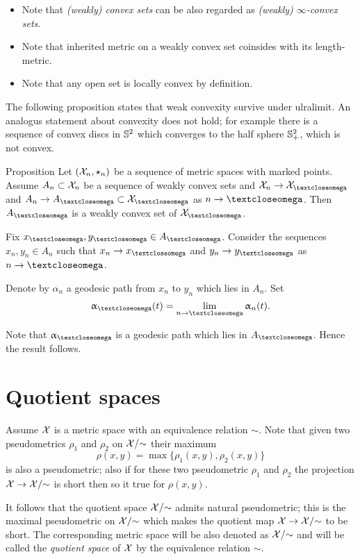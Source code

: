 \begin{itemize}
\item Note that \emph{(weakly) convex sets} can be also regarded as \emph{(weakly) $\infty$-convex sets}.
\item Note that inherited metric on a weakly convex set coinsides with its length-metric.
\item Note that any open set is locally convex by definition.
\end{itemize}

The following proposition states that weak convexity survive under ulralimit.
An analogus statement about convexity does not hold;
for example there is a sequence of convex discs in $\mathbb{S}^2$ which converges to the half sphere $\mathbb{S}^2_+$, which is not convex.

\begin{thm}{Proposition}\label{prop:weak-convex-stable}
Let $(\mathcal{X}_n,\star_n)$ be a sequence of metric spaces with marked points.
Assume $A_n\subset \spc{X}_n$ be a sequence of weakly convex sets and 
$\spc{X}_n\to \spc{X}_\o$ and $A_n\to A_\o\subset \spc{X}_\o$ as $n\to\o$.
Then $A_\o$ is a weakly convex set of $\spc{X}_\o$.
\end{thm}

Fix $x_\o,y_\o\in A_\o$.
Consider the sequences $x_n,y_n\in A_n$ such that $x_n\to x_\o$ and $y_n\to y_\o$ as $n\to\o$.

Denote by $\alpha_n$ a geodesic path from $x_n$ to $y_n$ which lies in $A_n$.
Set
\[\alpha_\o(t)=\lim_{n\to \o}\alpha_n(t).\]

Note that $\alpha_\o$ is a geodesic path which lies in $A_\o$.
Hence the result follows.
\qeds






\section{Quotient spaces}\label{sec:quotient}

 Assume $\mathcal{X}$ is a metric space
with an equivalence relation $\sim$.
Note that given two pseudometrics $\rho_1$ and $\rho_2$ on $\mathcal{X}/{\sim}$
their maximum 
\[\rho(x,y)=\max\{\rho_1(x,y),\rho_2(x,y)\}\]
is also a pseudometric;
also if for these two pseudometric $\rho_1$ and $\rho_2$ the projection $\spc{X}\to\spc{X}/{\sim}$ is short then so it true for  $\rho(x,y)$.

It follows that 
the quotient space $\mathcal{X}/{\sim}$ admits natural pseudometric;
this is the maximal pseudometric on  $\mathcal{X}/{\sim}$ 
which makes the quotient map 
$\spc{X}\to\spc{X}/{\sim}$ to be short.
The corresponding metric space will be also denoted as $\mathcal{X}/{\sim}$
and will be called the \emph{quotient space} of $\mathcal{X}$ by the equivalence relation $\sim$.

